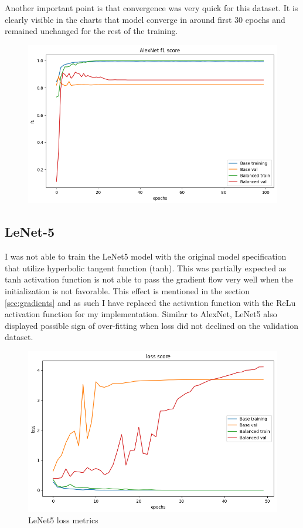 Another important point is that convergence was very quick for this dataset. 
It is clearly visible in the charts that model converge in around first 30 epochs and remained unchanged for the rest of the training.

\begin{figure}[H]
    \centering
    \includegraphics[width=.9\textwidth]{img/alexnetf1.png}
    \caption{}
    \label{fig:alexf1}
\end{figure}


\subsection{LeNet-5}
I was not able to train the LeNet5 model with the original model specification that utilize hyperbolic tangent function (tanh).
This was partially expected as tanh activation function is not able to pass the gradient flow very well when the initialization is not favorable.
This effect is mentioned in the section \ref{sec:gradients} and as such I have replaced the activation function with the ReLu activation function for my implementation.
Similar to AlexNet, LeNet5 also displayed possible sign of over-fitting when loss did not declined on the validation dataset.

\begin{figure}[H]
    \centering
    \includegraphics[width=.8\textwidth]{img/lenetloss.png}
    \caption{LeNet5 loss metrics}
    \label{fig:lenetloss}
\end{figure}

